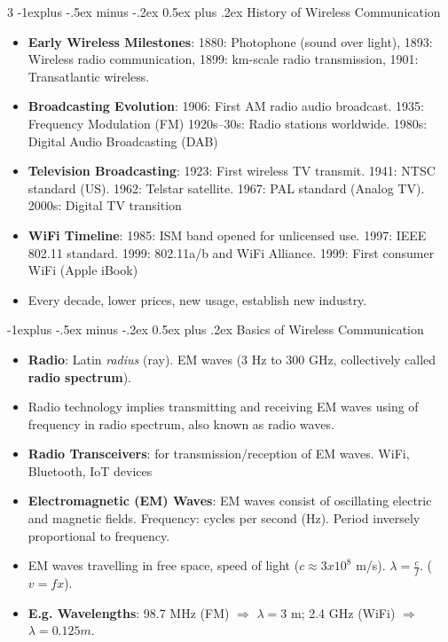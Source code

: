 \documentclass[a4paper, 9pt, landscape]{extarticle}
\makeatletter
\renewcommand{\subsection}{\@startsection{subsection}{2}{0mm}%
                                {-1explus -.5ex minus -.2ex}%
                                {0.5ex plus .2ex}%
                                {\normalfont\normalsize\bfseries}}
\makeatother
\begin{document}
\begin{multicols*}{3}
\subsection{History of Wireless Communication}
\begin{itemize}
  \item \textbf{Early Wireless Milestones}: 1880: Photophone (sound over light), 1893: Wireless radio communication, 1899: km-scale radio transmission, 1901: Transatlantic wireless.
  \item \textbf{Broadcasting Evolution}: 1906: First AM radio audio broadcast. 1935: Frequency Modulation (FM)
  1920s--30s: Radio stations worldwide. 1980s: Digital Audio Broadcasting (DAB)
  \item \textbf{Television Broadcasting}: 1923: First wireless TV transmit. 1941: NTSC standard (US). 1962: Telstar satellite. 1967: PAL standard (Analog TV). 2000s: Digital TV transition
  \item \textbf{WiFi Timeline}: 1985: ISM band opened for unlicensed use. 1997: IEEE 802.11 standard. 1999: 802.11a/b and WiFi Alliance. 1999: First consumer WiFi (Apple iBook)
  \item Every decade, lower prices, new usage, establish new industry.
\end{itemize}

\subsection{Basics of Wireless Communication}
\begin{itemize}
\item \textbf{Radio}: Latin \textit{radius} (ray). EM waves (3 Hz to 300 GHz, collectively called \textbf{radio spectrum}).
\item Radio technology implies transmitting and receiving EM waves using of frequency in radio spectrum, also known as radio waves.
\item \textbf{Radio Transceivers}: for transmission/reception of EM waves. WiFi, Bluetooth, IoT devices
\item \textbf{Electromagnetic (EM) Waves}: EM waves consist of oscillating electric and magnetic fields. Frequency: cycles per second (Hz). Period inversely proportional to frequency.
\item EM waves travelling in free space, speed of light ($ c\approx 3 x10^8$ m/s). $\lambda = \frac{c}{f}$. ($v = fx$).
\item \textbf{E.g. Wavelengths}: 98.7 MHz (FM) $\Rightarrow$ $\lambda = 3$ m; 2.4 GHz (WiFi) $\Rightarrow$ $\lambda = 0.125m$.
\end{itemize}


\end{multicols*}
\end{document}
